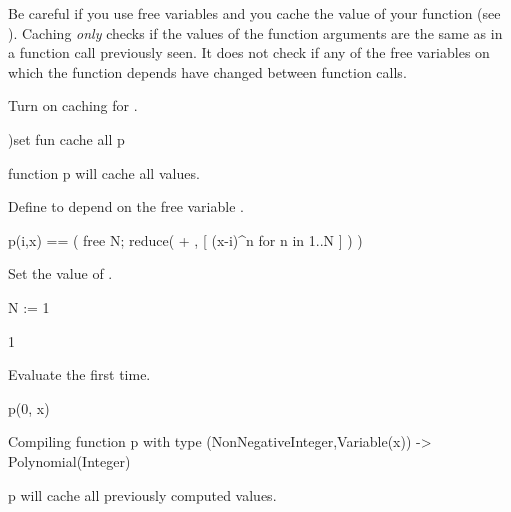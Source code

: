 Be careful if you use free variables and you cache the value of
your function (see ).
Caching {\it only} checks if the values of the function arguments
are the same as in a function call previously seen.
It does not check if any of the free variables on which the
function depends have changed between function calls.
\begin{xtc}
\begin{xtccomment}
Turn on caching for .
\end{xtccomment}
\begin{spadsrc}
)set fun cache all p 
\end{spadsrc}
\begin{SysCmdOutput}
   function p will cache all values.
\end{SysCmdOutput}
\end{xtc}
\begin{xtc}
\begin{xtccomment}
Define  to depend on the free variable .
\end{xtccomment}
\begin{spadsrc}
p(i,x) == ( free N; reduce( + , [ (x-i)^n for n in 1..N ] ) ) 
\end{spadsrc}
\end{xtc}
\begin{xtc}
\begin{xtccomment}
Set the value of .
\end{xtccomment}
\begin{spadsrc}
N := 1 
\end{spadsrc}
\begin{TeXOutput}
\begin{fricasmath}{13}
1%
\end{fricasmath}
\end{TeXOutput}
\end{xtc}
\begin{xtc}
\begin{xtccomment}
Evaluate  the first time.
\end{xtccomment}
\begin{spadsrc}
p(0, x) 
\end{spadsrc}
\begin{MessageOutput}
   Compiling function p with type (NonNegativeInteger,Variable(x)) -> 
      Polynomial(Integer) 
\end{MessageOutput}
\begin{MessageOutput}
   p will cache all previously computed values.
\end{MessageOutput}
\begin{TeXOutput}
\begin{fricasmath}{14}
%
\end{fricasmath}
\end{TeXOutput}
\end{xtc}
